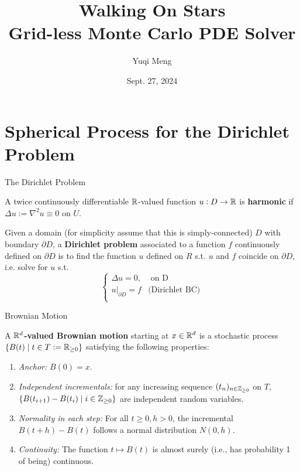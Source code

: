 \documentclass{beamer}
\title{Walking On Stars \\[1pt] {\Large Grid-less Monte Carlo PDE Solver}}
\author{Yuqi Meng}
\date{Sept. 27, 2024}
\begin{document}
\maketitle


\section{Spherical Process for the Dirichlet Problem}

\begin{frame}{The Dirichlet Problem}

	\begin{definition}\label{def: harmonic function}
		A twice continuously differentiable $\mathbb{R}$-valued function $u: D \to \mathbb{R}$ is \textbf{harmonic} if $\Delta u := \nabla^2 u \equiv 0$ on $U$.
	\end{definition}
	\horzline

	\begin{definition}
		Given a domain (for simplicity assume that this is simply-connected) $D$ with boundary $\partial D$, a \textbf{Dirichlet problem} associated to a function $f$ continuously defined on $\partial D$ is to find the function $u$ defined on $R$ s.t. $u$ and $f$ coincide on $\partial D$, i.e. solve for $u$ s.t.
		\[
			\begin{cases}
				\Delta u = 0, & \text{ on D} \\
				\left. u \right|_{\partial D} = f & \text{(Dirichlet BC)} \\
			\end{cases}
		\]
	\end{definition}
	\horzline

\end{frame}

\begin{frame}{Brownian Motion}

	\begin{definition}
		A \textbf{$\mathbb{R}^d$-valued Brownian motion} starting at $x \in \mathbb{R}^d$ is a stochastic process $\{ B(t) \mid t \in T := \mathbb{R}_{\geq 0} \}$ satisfying the following properties:
		\begin{enumerate}
			\item \emph{Anchor:} $B(0) = x$.
			\item \emph{Independent incrementals:} for any increasing sequence $(t_n)_{n \in \mathbb{Z}_{\geq 0}}$ on $T$, $\{ B(t_{i+1}) - B(t_i) \mid i \in \mathbb{Z}_{\geq 0} \}$ are independent random variables.
			\item \emph{Normality in each step:} For all $t \geq 0, h > 0$, the incremental $B(t + h) - B(t)$ follows a normal distribution $N(0, h)$.
			\item \emph{Continuity:} The function $t \mapsto B(t)$ is almost surely (i.e., has probability 1 of being) continuous.
		\end{enumerate}
	\end{definition}
	\horzline

\end{frame}
\end{document}
